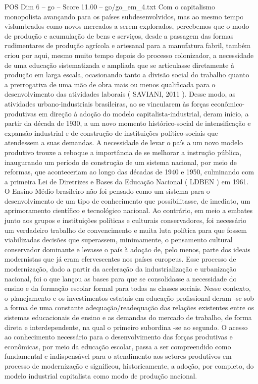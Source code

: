 \begin{textsample}{POS Dim 6 – go – Score 11.00 – go/go\_em\_4.txt}
Com o capitalismo monopolista avançando para os países subdesenvolvidos, mas ao mesmo tempo vislumbrados como novos mercados a serem explorados, percebemos que o modo de produção e acumulação de bens e serviços, desde a passagem das formas rudimentares de produção agrícola e artesanal para a manufatura fabril, também criou por aqui, mesmo muito tempo depois do processo colonizador, a necessidade de uma educação sistematizada e ampliada que se articulasse diretamente à produção em larga escala, ocasionando tanto a divisão social do trabalho quanto a prerrogativa de uma mão de obra mais ou menos qualificada para o desenvolvimento das atividades laborais ( SAVIANI, 2011 ).
Desse modo, as atividades urbano-industriais brasileiras, ao se vincularem às forças econômico-produtivas em direção à adoção do modelo capitalista-industrial, deram início, a partir da década de 1930, a um novo momento histórico-social de intensificação e expansão industrial e de construção de instituições político-sociais que atendessem a suas demandas.
A necessidade de levar o país a um novo modelo produtivo trouxe a reboque a importância de se melhorar a instrução pública, inaugurando um período de construção de um sistema nacional, por meio de reformas, que aconteceriam ao longo das décadas de 1940 e 1950, culminando com a primeira Lei de Diretrizes e Bases da Educação Nacional ( LDBEN ) em 1961.
O Ensino Médio brasileiro não foi pensado como um sistema para o desenvolvimento de um tipo de conhecimento que possibilitasse, de imediato, um aprimoramento científico e tecnológico nacional.
Ao contrário, em meio a embates junto aos grupos e instituições políticas e culturais conservadores, foi necessário um verdadeiro trabalho de convencimento e muita luta política para que fossem viabilizadas decisões que superassem, minimamente, o pensamento cultural conservador dominante e levasse o país à adoção de, pelo menos, parte dos ideais modernistas que já eram efervescentes nos países europeus.
Esse processo de modernização, dado a partir da aceleração da industrialização e urbanização nacional, foi o que lançou as bases para que se consolidasse a necessidade do ensino e da formação escolar formal para todas as classes sociais.
Nesse contexto, o planejamento e os investimentos estatais em educação profissional deram -se sob a forma de uma constante adequação/readequação das relações existentes entre os sistemas educacionais de ensino e as demandas do mercado de trabalho, de forma direta e interdependente, na qual o primeiro subordina -se ao segundo.
O acesso ao conhecimento necessário para o desenvolvimento das forças produtivas e econômicas, por meio da educação escolar, passa a ser compreendido como fundamental e indispensável para o atendimento aos setores produtivos em processo de modernização e significou, historicamente, a adoção, por completo, do modelo industrial capitalista como modo de produção nacional.

\end{textsample}
